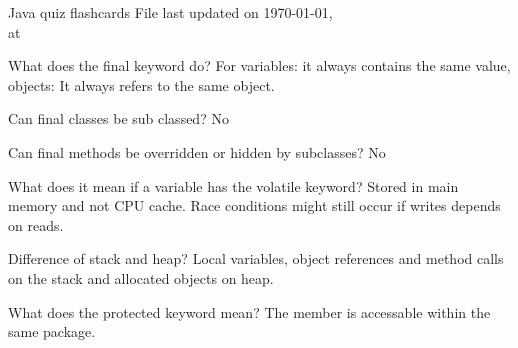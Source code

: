 \documentclass[avery5371,grid]{flashcards}
\begin{document}
\begin{flashcard}[Info]{Java quiz flashcards}
File last updated on \today, \\
at \currenttime

\end{flashcard}

\begin{flashcard}[Concurrency]{What does the final keyword do?}
For variables: it always contains the same value, objects: It always refers to the same object.
\end{flashcard}

\begin{flashcard}[Concurrency]{Can final classes be sub classed?}
No
\end{flashcard}

\begin{flashcard}[Concurrency]{Can final methods be overridden or hidden by subclasses?}
No
\end{flashcard}

\begin{flashcard}[Concurrency]{What does it mean if a variable has the volatile keyword?}
Stored in main memory and not CPU cache. Race conditions might still occur if writes depends on reads.
\end{flashcard}

\begin{flashcard}[Memory]{Difference of stack and heap?}
Local variables, object references and method calls on the stack and allocated objects on heap.
\end{flashcard}

\begin{flashcard}[Keywords]{What does the protected keyword mean?}
The member is accessable within the same package.
\end{flashcard}
\end{document}

